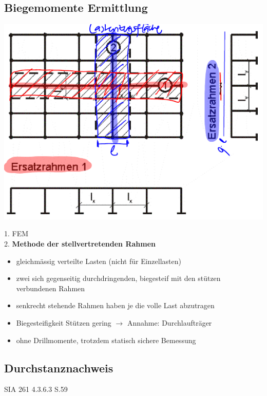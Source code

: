 	\begin{minipage}{0.5\linewidth}
		
		\subsection{Biegemomente Ermittlung}
		
			\includegraphics[width=0.5\linewidth]{images/PilzFlach3Rahmen.PNG}
	
	
	
			1. FEM \\
			2. \textbf{Methode der stellvertretenden Rahmen}

			
				\begin{itemize}
					
					\item gleichmässig verteilte Lasten (nicht für Einzellasten)
					
					\item zwei sich gegenseitig durchdringenden, biegesteif mit den stützen verbundenen Rahmen
					
					\item senkrecht stehende Rahmen haben je die volle Last abzutragen
					
					\item Biegesteifigkeit Stützen gering $\rightarrow$ Annahme: Durchlaufträger
					
					\item ohne Drillmomente, trotzdem statisch sichere Bemessung
					
				\end{itemize}
		
	\end{minipage}

	\begin{minipage}{0.5\linewidth}
		
		\subsection{Durchstanznachweis}
			SIA 261 4.3.6.3 S.59
		
	\end{minipage}